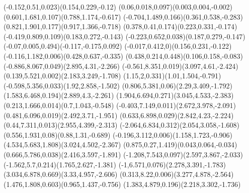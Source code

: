 \pstThreeDLine[linecolor=gray](-0.152,0.51,0.023)(0.154,0.229,-0.12)
\pstThreeDLine[linecolor=gray](0.06,0.018,0.097)(0.003,0.004,-0.002)
\pstThreeDLine[linecolor=gray](0.601,1.681,0.107)(0.788,1.174,-0.617)
\pstThreeDLine[linecolor=gray](-0.704,1.489,0.166)(0.361,0.538,-0.283)
\pstThreeDLine[linecolor=gray](0.821,1.901,0.177)(0.917,1.366,-0.718)
\pstThreeDLine[linecolor=gray](0.378,0.41,0.174)(0.223,0.331,-0.174)
\pstThreeDLine[linecolor=gray](-0.419,0.809,0.109)(0.183,0.272,-0.143)
\pstThreeDLine[linecolor=gray](-0.223,0.652,0.038)(0.187,0.279,-0.147)
\pstThreeDLine[linecolor=gray](-0.07,0.005,0.494)(-0.117,-0.175,0.092)
\pstThreeDLine[linecolor=gray](-0.017,0.412,0)(0.156,0.231,-0.122)
\pstThreeDLine[linecolor=gray](-0.116,1.182,0.006)(0.428,0.637,-0.335)
\pstThreeDLine[linecolor=gray](0.438,0.214,0.448)(0.106,0.158,-0.083)
\pstThreeDLine[linecolor=gray](-0.886,8.067,0.049)(2.895,4.31,-2.266)
\pstThreeDLine[linecolor=gray](-0.561,8.351,0.019)(3.097,4.61,-2.424)
\pstThreeDLine[linecolor=gray](0.139,5.521,0.002)(2.183,3.249,-1.708)
\pstThreeDLine[linecolor=gray](1.15,2,0.331)(1.01,1.504,-0.791)
\pstThreeDLine[linecolor=gray](-0.598,5.356,0.033)(1.92,2.858,-1.502)
\pstThreeDLine[linecolor=gray](0.806,5.381,0.06)(2.29,3.409,-1.792)
\pstThreeDLine[linecolor=gray](1.583,6.468,0.194)(2.889,4.3,-2.261)
\pstThreeDLine[linecolor=gray](1.904,6.694,0.271)(3.045,4.533,-2.383)
\pstThreeDLine[linecolor=gray](0.213,1.666,0.014)(0.7,1.043,-0.548)
\pstThreeDLine[linecolor=gray](-0.403,7.149,0.011)(2.672,3.978,-2.091)
\pstThreeDLine[linecolor=gray](0.481,6.096,0.019)(2.492,3.71,-1.951)
\pstThreeDLine[linecolor=gray](0.633,6.898,0.029)(2.842,4.23,-2.224)
\pstThreeDLine[linecolor=gray](0.44,7.311,0.013)(2.955,4.399,-2.313)
\pstThreeDLine[linecolor=gray](-2.064,6.834,0.312)(2.054,3.058,-1.608)
\pstThreeDLine[linecolor=gray](0.556,1.931,0.08)(0.88,1.31,-0.689)
\pstThreeDLine[linecolor=gray](-0.196,3.112,0.006)(1.158,1.723,-0.906)
\pstThreeDLine[linecolor=gray](4.534,5.683,1.808)(3.024,4.502,-2.367)
\pstThreeDLine[linecolor=gray](0.875,0.27,1.419)(0.043,0.064,-0.034)
\pstThreeDLine[linecolor=gray](0.666,5.786,0.038)(2.416,3.597,-1.891)
\pstThreeDLine[linecolor=gray](-1.208,7.543,0.097)(2.597,3.867,-2.033)
\pstThreeDLine[linecolor=gray](-1.562,5.7,0.214)(1.765,2.627,-1.381)
\pstThreeDLine[linecolor=gray](-1,6.571,0.076)(2.278,3.391,-1.783)
\pstThreeDLine[linecolor=gray](3.034,6.878,0.669)(3.33,4.957,-2.606)
\pstThreeDLine[linecolor=gray](0.313,8.22,0.006)(3.277,4.878,-2.564)
\pstThreeDLine[linecolor=gray](1.476,1.808,0.603)(0.965,1.437,-0.756)
\pstThreeDLine[linecolor=gray](1.383,4.879,0.196)(2.218,3.302,-1.736)
